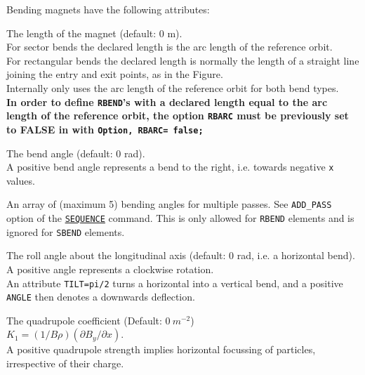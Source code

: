 Bending magnets have the following attributes:
\begin{madlist}
    The length of the magnet (default: 0 m). \\
   For sector bends the declared length is the arc length 
   of the reference orbit. \\
   For rectangular bends the declared length is normally the length of a
   straight line joining the entry and exit points, as in the
   Figure. \\ 
   Internally \madx only uses the arc length of the reference orbit for
   both bend types.\\ 
   {\bf In order to define {\tt RBEND}'s with a declared length equal to the
     arc length of the reference orbit, the option {\tt RBARC} must be
     previously set to FALSE in \madx with {\tt Option, RBARC= false;}} 
   
    The bend angle (default: 0 rad). \\ 
   A positive bend angle represents a bend to the right, i.e. towards
   negative {\tt x} values.  
   
    An array of (maximum 5) bending angles for
   multiple passes. See {\tt ADD\_PASS} option of the
   \href{sequence.html}{\tt SEQUENCE} command. This is only allowed for
   {\tt RBEND} elements and is ignored for {\tt SBEND} elements. 
 
    The roll angle about the longitudinal axis (default: 0
   rad, i.e. a horizontal bend). \\ 
   A positive angle represents a clockwise rotation. \\ 
   An attribute {\tt TILT=pi/2} turns a
   horizontal into a vertical bend, and a positive {\tt ANGLE} then denotes a
   downwards deflection.


    The quadrupole coefficient (Default: $0\ m^{-2}$)\\
     $K_1 = (1/B\rho) (\partial B_y / \partial x)$. \\
     A positive quadrupole strength implies horizontal focussing of particles, 
     irrespective of their charge.


\end{madlist}
